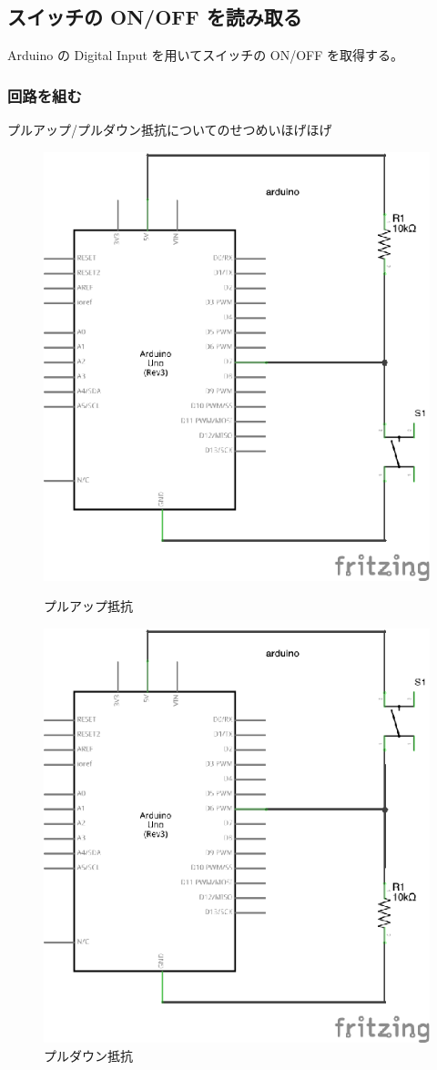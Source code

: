 \documentclass[11pt,a4paper]{jarticle}
\begin{document}
\subsection*{スイッチの ON/OFF を読み取る}
Arduino の Digital Input を用いてスイッチの ON/OFF を取得する。

\subsubsection*{回路を組む}
プルアップ/プルダウン抵抗についてのせつめいほげほげ

\begin{figure}[h!]
 \begin{minipage}{0.5\columnwidth}
  \centering
  \includegraphics[width=0.8\columnwidth]{img/pullup.eps}
  \caption{プルアップ抵抗}
 \end{minipage}
 \begin{minipage}{0.5\columnwidth}
  \centering
  \includegraphics[width=0.8\columnwidth]{img/pulldown.eps}
  \caption{プルダウン抵抗}
 \end{minipage}
\end{figure}
\end{document}
